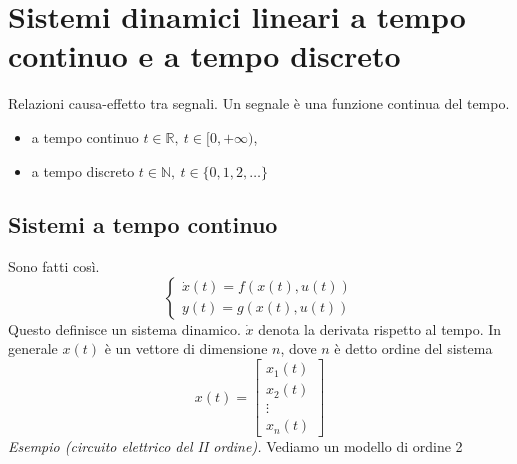 
\chapter{Sistemi dinamici lineari a tempo continuo e a tempo discreto}

Relazioni causa-effetto tra segnali. Un segnale è una funzione continua del tempo.
\begin{itemize}
	\item a tempo continuo $t\in \mathbb{R} ,\ t\in [ 0,+\infty)$,
	\item a tempo discreto $t\in \mathbb{N} ,\ t\in \{0,1,2,\dotsc \}$
\end{itemize}

\section{Sistemi a tempo continuo}

Sono fatti così.
\begin{equation*}
	\boxed{
		\begin{cases}
			\dot{x} (t)=f(x(t),u(t)) \\
			y(t)=g(x(t),u(t))      
		\end{cases}
	}
\end{equation*}
Questo definisce un sistema dinamico. $\dot{x}$ denota la derivata rispetto al tempo. In generale $x(t)$ è un vettore di dimensione $n$, dove $n$ è detto ordine del sistema
\begin{equation*}
	x(t) =\begin{bmatrix}
	x_1(t)\\
	x_2(t)\\
	\vdots \\
	x_n(t)
	\end{bmatrix}
\end{equation*}
\textit{Esempio (circuito elettrico del II ordine).} Vediamo un modello di ordine 2


